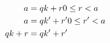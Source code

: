 \documentclass{article}
\begin{document}
	\begin{align}
	a & = qk + r \space 0 \le r < a \\
	a & = qk' + r' \space 0 \le r' < a \\
	qk + r & = qk' + r' \\
	\end{align}
\end{document}
